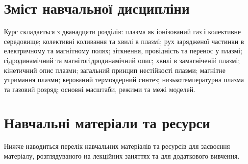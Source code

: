 \documentclass{Syllabus}
\begin{document}
\section{Зміст навчальної дисципліни}


Курс складається з дванадцяти розділів: плазма як іонізований газ і колективне середовище; колективні коливання та хвилі в плазмі; рух зарядженої частинки в електричному та магнітному полях; зіткнення, провідність та перенос у плазмі; гідродинамічний та магнітогідродинамічний опис; хвилі в замагніченій плазмі; кінетичний опис плазми; загальний принцип нестійкості плазми; магнітне утримання плазми; керований термоядерний синтез; низькотемпературна плазма та газовий розряд; основні масштаби, режими та межі моделей.

%


\section{Навчальні матеріали та ресурси}\label{sec:refsec}

Нижче наводиться перелік навчальних матеріалів та ресурсів для засвоєння матеріалу, розглядуваного на лекційних заняттях та для додаткового вивчення.

\nocite{%
	ponomarenko2026plasma,
	anisimov2018,
	sitenko1996,
	zagorodny2006kinetic,
	chen2016introduction,
	gurnett2017introduction,
	bellan2006fundamentals,
	freidberg2007plasma,
	stix1992waves,
	krall1973principles,
	kulsrud2005plasma,
	hazeltine2004framework,
	priest2000reconnection,
	goldston1995introduction,
	boyd2003physics,
	bittencourt2004fundamentals,
	nicholson1983introduction,
	lieberman2005principles,
	raizer1991gas,
	chen2003lecture,
}
\end{document}
